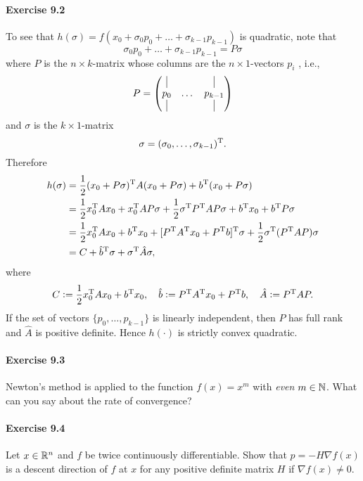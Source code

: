\paragraph{Exercise 9.2}  %
To see that $h(\sigma) = f (x_0 + \sigma_0 p_0 +\dots+ \sigma_{k−1} p_{k−1})$ is quadratic, note that
\[
\sigma_0 p_0 + \dots + \sigma_{k−1} p_{k−1} = P\sigma
\]
where $P$ is the $n \times k$-matrix whose columns are the $n\times 1$-vectors $p_i$ , i.e.,
\[
P =
\begin{pmatrix}
\vline & & \vline\\
p_0 & \dots & p_{k-1}\\
\vline & & \vline
\end{pmatrix}
\]
and $\sigma$ is the $k \times 1$-matrix
\[
\sigma = (\sigma_0,\dots,\sigma_{k-1})^{\text{\upshape T}}.
\]
Therefore
\[
\begin{split}
h(\sigma)
&= \frac{1}{2}(x_0 + P\sigma)^{\text{\upshape T}} A (x_0+P\sigma) + b^{\text{\upshape T}} (x_0 + P\sigma)\\
&= \frac{1}{2} x_0^{\text{\upshape T}} A x_0 + x_0^{\text{\upshape T}} A P \sigma + \frac{1}{2}\sigma^{\text{\upshape T}} P^{\text{\upshape T}} AP\sigma + b^{\text{\upshape T}} x_0 + b^{\text{\upshape T}} P\sigma\\
&= \frac{1}{2} x_0^{\text{\upshape T}} A x_0 + b^{\text{\upshape T}} x_0 + [P^{\text{\upshape T}} A^{\text{\upshape T}} x_0 + P^{\text{\upshape T}} b]^{\text{\upshape T}}\sigma + \frac{1}{2}\sigma^{\text{\upshape T}} (P^{\text{\upshape T}} A P)\sigma\\
&= C + \hat{b}^{\text{\upshape T}} \sigma + \sigma^{\text{\upshape T}} \hat{A}\sigma,
\end{split}
\]
where
\[
C \mathrel{\mathop:}=\frac{1}{2} x_0^{\text{\upshape T}} A x_0 + b^{\text{\upshape T}} x_0,
\quad
\hat{b}\mathrel{\mathop:}= P^{\text{\upshape T}} A^{\text{\upshape T}} x_0 + P^{\text{\upshape T}} b,
\quad
\hat{A} \mathrel{\mathop:}= P^{\text{\upshape T}} A P.
\]
If the set of vectors $\{p_0,\dots, p_{k-1}\}$ is linearly independent, then
$P$ has full rank and $\hat{A}$ is positive definite. Hence $h(\cdot)$ is
strictly convex quadratic.


\paragraph{Exercise 9.3}
Newton's method is applied to the function $f(x)=x^m$ with \emph{even}
$m\in\mathbb{N}$. What can you say about the rate of convergence?

\paragraph{Exercise 9.4}
Let $x \in \mathbb{R}^n$ and $f$ be twice continuously differentiable. Show that $p =
-H\nabla f(x)$ is a descent direction of $f$ at $x$ for any positive definite
matrix $H$ if $\nabla f(x) \neq 0$.

